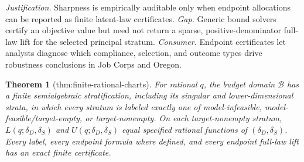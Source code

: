 \documentclass{article}
\newtheorem{theorem}{Theorem}
\begin{document}
\par\smallskip\noindent \textit{Justification.} Sharpness is empirically auditable only when endpoint allocations can be reported as finite latent-law certificates. \textit{Gap.} Generic bound solvers certify an objective value but need not return a sparse, positive-denominator full-law lift for the selected principal stratum. \textit{Consumer.} Endpoint certificates let analysts diagnose which compliance, selection, and outcome types drive robustness conclusions in Job Corps and Oregon.

\begin{theorem}[thm:finite-rational-charts]\label{thm:finite-rational-charts}
For rational \(q\), the budget domain \(\mathcal B\) has a finite semialgebraic stratification, including its singular and lower-dimensional strata, in which every stratum is labeled exactly one of model-infeasible, model-feasible/target-empty, or target-nonempty.  On each target-nonempty stratum, \(L(q;\delta_D,\delta_S)\) and \(U(q;\delta_D,\delta_S)\) equal specified rational functions of \((\delta_D,\delta_S)\).  Every label, every endpoint formula where defined, and every endpoint full-law lift has an exact finite certificate.
\end{theorem}
\end{document}
